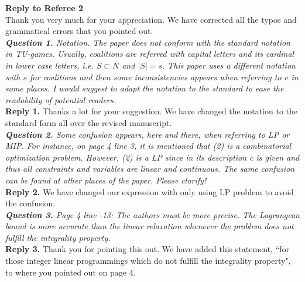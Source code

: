 \documentclass[11pt]{article}
\begin{document}
\noindent \textbf{\large Reply to Referee 2}
\\[3mm]
Thank you very much for your appreciation.
We have corrected all the typos and grammatical errors that you pointed out.
~\\[4mm]
%
%
%
\noindent \textit{\textbf{Question 1.}
Notation. The paper does not conform with the standard notation in TU-games. Usually, coalitions are referred with capital letters and its cardinal in lower case letters, i.e. $S \subset N$ and $|S| = s$. This paper uses a different notation with $s$ for coalitions and then some inconsistencies appears when referring to $v$ in some places. I would suggest to adapt the notation to the standard to ease the readability of potential readers.}
~\\[2mm]
\noindent \textbf{Reply 1.}
Thanks a lot for your suggestion.
We have changed the notation to the standard form all over the revised manuscript.
\\[4mm]
%
%
%
\noindent \textit{\textbf{Question 2.}
Some confusion appears, here and there, when referring to LP or MIP.
For instance, on page 4 line 3, it is mentioned that (2) is a combinatorial optimization problem. However, (2) is a LP since in its description c is
given and thus all constraints and variables are linear and continuous.
The same confusion can be found at other places of the paper. Please clarify!}
\\[2mm]
\noindent \textbf{Reply 2.}
We have changed our expression with only using LP problem to avoid the confusion.
\\[4mm]
%
%
%
\noindent \textit{\textbf{Question 3.}
Page 4 line -13: The authors must be more precise. The Lagrangean
bound is more accurate than the linear relaxation whenever the problem does not fulfill the integrality property.
}
\\[2mm]
\noindent \textbf{Reply 3.}
Thank you for pointing this out.
We have added this statement, ``for those integer linear programmings which do not fulfill the integrality property", to where you pointed out on page 4.
\\[4mm]
\end{document}

